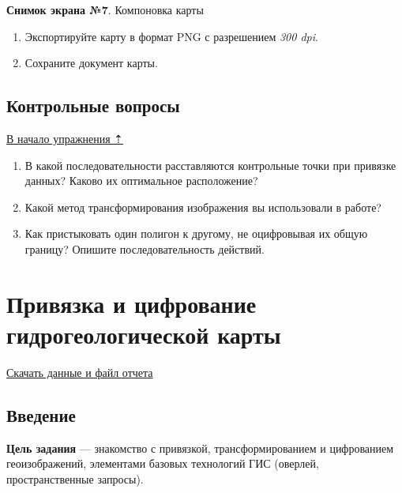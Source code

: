 \documentclass[12pt,]{book}
\begin{document}
\textbf{Снимок экрана №7}. Компоновка карты

\begin{enumerate}
\def\labelenumi{\arabic{enumi}.}
\item
  Экспортируйте карту в формат PNG с разрешением \emph{300 dpi}.
\item
  Сохраните документ карты.
\end{enumerate}

\hypertarget{map-ref-general-questions}{%
\section{Контрольные вопросы}\label{map-ref-general-questions}}

\protect\hyperlink{map-ref-general}{В начало упражнения ⇡}

\begin{enumerate}
\def\labelenumi{\arabic{enumi}.}
\item
  В какой последовательности расставляются контрольные точки при привязке данных? Каково их оптимальное расположение?
\item
  Какой метод трансформирования изображения вы использовали в работе?
\item
  Как пристыковать один полигон к другому, не оцифровывая их общую границу? Опишите последовательность действий.
\end{enumerate}

\hypertarget{map-ref-hydrogeologic}{%
\chapter{Привязка и цифрование гидрогеологической карты}\label{map-ref-hydrogeologic}}

\href{http://autolab.geogr.msu.ru/gis/data/Ex06.zip}{Скачать данные и файл отчета}

\hypertarget{map-ref-hydrogeologic-intro}{%
\section{Введение}\label{map-ref-hydrogeologic-intro}}

\textbf{Цель задания} --- знакомство с привязкой, трансформированием и цифрованием геоизображений, элементами базовых технологий ГИС (оверлей, пространственные запросы).
\end{document}
